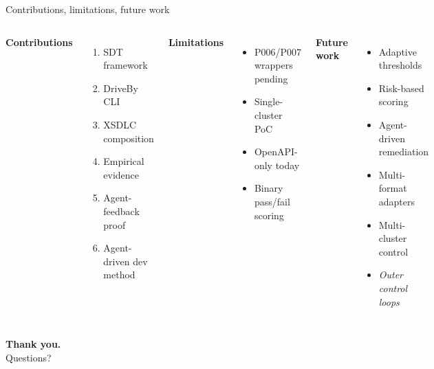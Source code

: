 \documentclass[10pt,aspectratio=169]{beamer}
\begin{document}
\begin{frame}{Contributions, limitations, future work}

\begin{columns}[T,onlytextwidth]

\textbf{Contributions}\\[0.5em]
\footnotesize
\begin{enumerate}\setlength\itemsep{0.2em}
  \item SDT framework
  \item DriveBy CLI
  \item XSDLC composition
  \item Empirical evidence
  \item Agent-feedback proof
  \item Agent-driven dev method
\end{enumerate}

\textbf{Limitations}\\[0.5em]
\footnotesize
\begin{itemize}\setlength\itemsep{0.2em}
  \item P006/P007 wrappers pending
  \item Single-cluster PoC
  \item OpenAPI-only today
  \item Binary pass/fail scoring
\end{itemize}

\textbf{Future work}\\[0.5em]
\footnotesize
\begin{itemize}\setlength\itemsep{0.2em}
  \item Adaptive thresholds
  \item Risk-based scoring
  \item Agent-driven remediation
  \item Multi-format adapters
  \item Multi-cluster control
  \item \emph{Outer control loops}
\end{itemize}

\end{columns}

\vspace{2em}
\begin{center}
\Large\textbf{Thank you.}\\[0.6em]
\normalsize Questions?
\end{center}

\end{frame}
\end{document}
